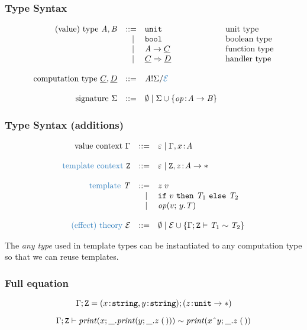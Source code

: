 \documentclass[usenames,dvipsnames]{beamer}
\begin{document}
\begin{frame}
  \frametitle{Type Syntax}
  \[
	\begin{array}{rrll}
		\text{(value) type}~\tyA, \tyB
		 & ::=   & \unittype          & \text{unit type}\\
		 & \vsep & \booltype          & \text{boolean type}\\
		 & \vsep & \tyA \to \ctyC     & \text{function type}\\
		 & \vsep & \ctyC \hto \ctyD   & \text{handler type}\\
		\\
		\text{computation type}~\ctyC, \ctyD
		 & ::=   & \ctype{\tyA}{\sig}{\new{\eqE}}\\
		\\
		\text{signature}~\sig
		 & ::=   & \nil \vsep \sig \union \set{{\op \oftype \tyA \to \tyB}}\\
	\end{array}
\]


\end{frame}
\begin{frame}
  \frametitle{Type Syntax (additions)}
  \[
	\begin{array}{rrll}
		\text{value context}~\ctx
		 & ::=   & \varepsilon \vsep \ctx, x \oftype \tyA \\
		\\
		\new{ \text{template context}}~\tvars
		 & ::=   & \varepsilon \vsep \tvars, z \oftype \tyA \to \anytype \\
    \\
		\new{\text{template}}~\tmplT
		 & ::=   & \apply{z}{v} \\
		 & \vsep & \ifclause{v}{\tmplT_1}{\tmplT_2} \\
		 & \vsep & \operation{v}{y.\tmplT} \\
		\\
		\new{\text{(effect) theory}}~\eqE
		 & ::=   & \nil \vsep \eqE \union
		\set{\teqjudgement{\tenv}{\tmplT_1 \rel \tmplT_2}}\\
	\end{array}
  \]
  
  The \emph{any type} \new{$\anytype$} used in template types can be instantiated to any computation type so that we can reuse templates.
\end{frame}
\begin{frame}
  \frametitle{Full equation}
	\[{\Gamma};{\mathtt{Z}} = {(x \!:\! \texttt{string}, y \!:\! \texttt{string})};{(z \!:\! \mathtt{unit} \to \mathtt{*})}
	\]
	
	\[
    {{\Gamma};{\mathtt{Z}}}\vdash {
      \mathit{print}(x; \_.\mathit{print}(y; \_.{z}\;{\mathtt{(\,)}}))
      \sim\mathit{print}(x \;\hat{}\;y; \_.{z}\;{\mathtt{(\,)}})
      }
  \]
\end{frame}
\end{document}
